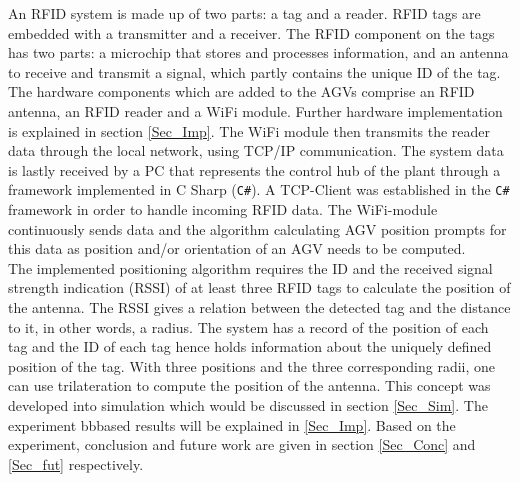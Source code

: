 An RFID system is made up of two parts: a tag and a reader. RFID tags are embedded with a transmitter and a receiver. The RFID component on the tags has two parts: a microchip that stores and processes information, and an antenna to receive and transmit a signal, which partly contains the unique ID of the tag. The hardware components which are added to the AGVs comprise an RFID antenna, an RFID reader and a WiFi module. Further hardware implementation is explained in section \ref{Sec_Imp}. The WiFi module then transmits the reader data through the local network, using TCP/IP communication. The system data is lastly received by a PC that represents the control hub of the plant through a framework implemented in C Sharp (\texttt{C\#}). A TCP-Client was established in the \texttt{C\#} framework in order to handle incoming RFID data. The WiFi-module continuously sends data and the algorithm calculating AGV position prompts for this data as position and/or orientation of an AGV needs to be computed.\\

The implemented positioning algorithm requires the ID and the received signal strength indication (RSSI) of at least three RFID tags to calculate the position of the antenna. The RSSI gives a relation between the detected tag and the distance to it, in other words, a radius. The system has a record of the position of each tag and the ID of each tag hence holds information about the uniquely defined position of the tag. With three positions and the three corresponding radii, one can use trilateration to compute the position of the antenna. This concept was developed into simulation which would be discussed in section \ref{Sec_Sim}. The experiment bbbased results will be explained in \ref{Sec_Imp}. Based on the experiment, conclusion and future work are given in section \ref{Sec_Conc} and \ref{Sec_fut} respectively.





